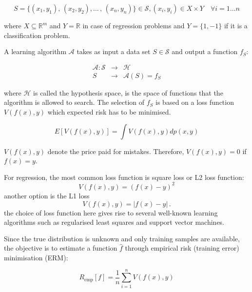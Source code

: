 $$
S= \{(x_1,y_1),\,(x_2,y_2),\dots\,,\,(x_n,y_n)\} \in \mathcal{S}, (x_i,y_i) \in X\times Y \quad \forall i = 1\dots n
$$

\noindent where $X \subseteq \mathbb{R}^m$ and $Y = \mathbb{R}$ in case of regression problems and $Y = \{1,-1\}$  if it is a classification problem. 

A learning algorithm $\mathcal{A}$ takes as input a data set $S \in \mathcal{S}$ and output a function $f_S$:

\begin{eqnarray*}
\mathcal{A}: \mathcal{S} &\rightarrow & \mathcal{H} \\
S &\rightarrow &\mathcal{A}(S) = f_S
\end{eqnarray*}

\noindent where $\mathcal{H}$ is called the hypothesis space, is the space of functions that the algorithm is allowed to search. The selection of $f_S$ is based on a loss function $V(f(x),y)$ which expected risk has to be minimised.

\[
E[V(f(x),y)] = \int V(f(x),y) dp(x,y)
\]

\noindent $V(f(x),y)$ denote the price paid for mistakes. Therefore, $V(f(x),y)=0$ if$f(x)=y$.

For regression, the most common loss function is square loss or L2 loss function:
\begin{equation}
\label{eq:l2loss}
V(f(x),y) = (f(x)-y)^2
\end{equation}
\noindent another option is the L1 loss
\begin{equation}
\label{eq:l1loss}
V(f(x),y) = |f(x)-y| \, .
\end{equation}
\noindent the choice of loss function here gives rise to several well-known learning algorithms such as regularised least squares and support vector machines. %

Since the true distribution is unknown and only training samples are available, the objective is to estimate a function $\hat{f}$ through empirical risk (training error) minimisation (ERM): 

\begin{equation} 
\label{eq:erm}
R_{\text{emp}}[f] = \frac{1}{n} \sum_{i=1}^n V(f(x),y)
\end{equation}

